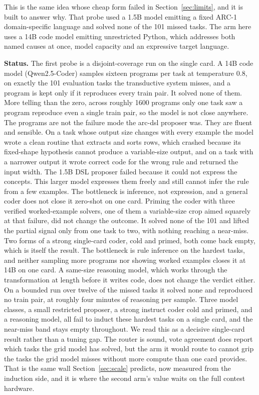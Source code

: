 \documentclass[11pt]{article}
\begin{document}
This is the same idea whose cheap form failed in Section~\ref{sec:limits}, and it is built to answer why.
That probe used a 1.5B model emitting a fixed ARC-1 domain-specific language and solved none of the 101
missed tasks. The arm here uses a 14B code model emitting unrestricted Python, which addresses both named
causes at once, model capacity and an expressive target language.

\textbf{Status.} The first probe is a disjoint-coverage run on the single card. A 14B code model
(Qwen2.5-Coder) samples sixteen programs per task at temperature 0.8, on exactly the 101 evaluation tasks
the transductive system misses, and a program is kept only if it reproduces every train pair. It solved
none of them. More telling than the zero, across roughly 1600 programs only one task saw a program
reproduce even a single train pair, so the model is not close anywhere. The programs are not the failure
mode the arc-dsl proposer was. They are fluent and sensible. On a task whose output size changes with
every example the model wrote a clean routine that extracts and sorts rows, which crashed because its
fixed-shape hypothesis cannot produce a variable-size output, and on a task with a narrower output it
wrote correct code for the wrong rule and returned the input width. The 1.5B DSL proposer failed because
it could not express the concepts. This larger model expresses them freely and still cannot infer the
rule from a few examples. The bottleneck is inference, not expression, and a general coder does not close
it zero-shot on one card. Priming the coder with three verified worked-example solvers, one of them a
variable-size crop aimed squarely at that failure, did not change the outcome. It solved none of the 101
and lifted the partial signal only from one task to two, with nothing reaching a near-miss. Two forms of
a strong single-card coder, cold and primed, both come back empty, which is itself the result. The
bottleneck is rule inference on the hardest tasks, and neither sampling more programs nor showing worked
examples closes it at 14B on one card. A same-size reasoning model, which works
through the transformation at length before it writes code, does not change the verdict either. On a
bounded run over twelve of the missed tasks it solved none and reproduced no train pair, at roughly four
minutes of reasoning per sample. Three model classes, a small restricted proposer, a strong instruct
coder cold and primed, and a reasoning model, all fail to induct these hardest tasks on a single card,
and the near-miss band stays empty throughout. We read this as a decisive single-card result rather than
a tuning gap. The router is sound, vote agreement does report which tasks the grid model has solved, but
the arm it would route to cannot grip the tasks the grid model misses without more compute than one card
provides. That is the same wall Section~\ref{sec:scale} predicts, now measured from the induction side,
and it is where the second arm's value waits on the full contest hardware.
\end{document}
